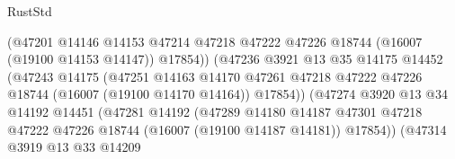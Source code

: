 \begin{lexlean}{RustStd}
\begin{coremodule}
                                        (@47201
                                          @14146
                                          @14153
                                          @47214
                                          @47218
                                          @47222
                                          @47226
                                          @18744
                                          (@16007 (@19100 @14153 @14147))
                                          @17854))
                                      (@47236
                                        @3921
                                        @13
                                        @35
                                        @14175
                                        @14452
                                        (@47243
                                          @14175
                                          (@47251
                                            @14163
                                            @14170
                                            @47261
                                            @47218
                                            @47222
                                            @47226
                                            @18744
                                            (@16007 (@19100 @14170 @14164))
                                            @17854))
                                        (@47274
                                          @3920
                                          @13
                                          @34
                                          @14192
                                          @14451
                                          (@47281
                                            @14192
                                            (@47289
                                              @14180
                                              @14187
                                              @47301
                                              @47218
                                              @47222
                                              @47226
                                              @18744
                                              (@16007 (@19100 @14187 @14181))
                                              @17854))
                                          (@47314
                                            @3919
                                            @13
                                            @33
                                            @14209

\end{coremodule}
\end{lexlean}
